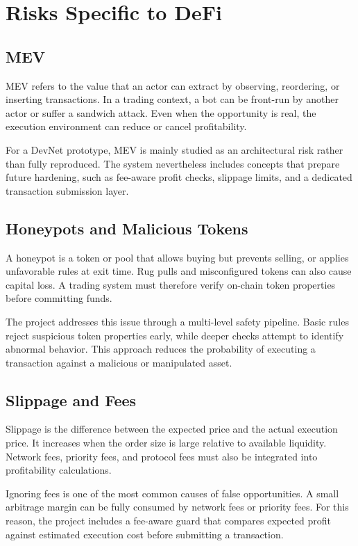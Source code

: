 \documentclass[12pt,a4paper]{report}
\begin{document}
\section{Risks Specific to DeFi}

\subsection{MEV}

MEV refers to the value that an actor can extract by observing, reordering, or inserting transactions. In a trading context, a bot can be front-run by another actor or suffer a sandwich attack. Even when the opportunity is real, the execution environment can reduce or cancel profitability.

For a DevNet prototype, MEV is mainly studied as an architectural risk rather than fully reproduced. The system nevertheless includes concepts that prepare future hardening, such as fee-aware profit checks, slippage limits, and a dedicated transaction submission layer.

\subsection{Honeypots and Malicious Tokens}

A honeypot is a token or pool that allows buying but prevents selling, or applies unfavorable rules at exit time. Rug pulls and misconfigured tokens can also cause capital loss. A trading system must therefore verify on-chain token properties before committing funds.

The project addresses this issue through a multi-level safety pipeline. Basic rules reject suspicious token properties early, while deeper checks attempt to identify abnormal behavior. This approach reduces the probability of executing a transaction against a malicious or manipulated asset.

\subsection{Slippage and Fees}

Slippage is the difference between the expected price and the actual execution price. It increases when the order size is large relative to available liquidity. Network fees, priority fees, and protocol fees must also be integrated into profitability calculations.

Ignoring fees is one of the most common causes of false opportunities. A small arbitrage margin can be fully consumed by network fees or priority fees. For this reason, the project includes a fee-aware guard that compares expected profit against estimated execution cost before submitting a transaction.
\end{document}
